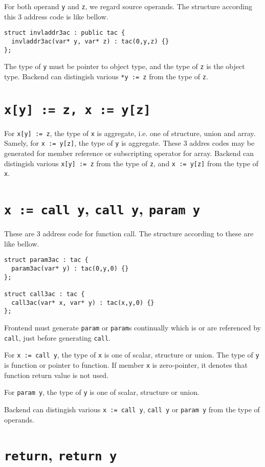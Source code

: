 For both operand {\tt{y}} and {\tt{z}}, we regard source operands.
The structure according this 3 address code is like bellow.
\begin{verbatim}
struct invladdr3ac : public tac {
  invladdr3ac(var* y, var* z) : tac(0,y,z) {}
};
\end{verbatim}
The type of {\tt{y}} must be pointer to object type,
and the type of {\tt{z}} is the object type.
Backend can distingish various {\tt{*y := z}} from the type of {\tt{z}}.

\section{\tt{x[y] := z}, \tt{x := y[z]}}
\label{3ac_e004}
For {\tt{x[y] := z}}, the type of {\tt{x}} is aggregate, i.e.
one of structure, union and array.
Samely, for {\tt{x := y[z]}}, the type of {\tt{y}} is aggregate.
These 3 addres codes may be
generated for member reference or subscripting operator for array.
Backend can distingish various {\tt{x[y] := z}} from the type of
{\tt{z}}, and {\tt{x := y[z]}} from the type of {\tt{x}}.

\section{{\tt{x := call y}}, {\tt{call y}}, {\tt{param y}}}

\label{_3ac_e000} These are 3 address code for function call.
The structure according to these are like bellow.
\begin{verbatim}
struct param3ac : tac {
  param3ac(var* y) : tac(0,y,0) {}
};

struct call3ac : tac {
  call3ac(var* x, var* y) : tac(x,y,0) {}
};
\end{verbatim}
Frontend must generate {\tt{param}} or {\tt{param}}s continually
which is or are referenced by {\tt{call}}, just before generating
{\tt{call}}.

For {\tt{x := call y}}, the type of {\tt{x}} is one
of scalar, structure or union.
The type of {\tt{y}} is function or pointer to function.
If member {\tt{x}} is zero-pointer, it denotes that
function return value is not used.

For {\tt {param y}}, the type of {\tt{y}} is one of
scalar, structure or union.

Backend can distingish various 
{\tt{x := call y}}, {\tt{call y}} or {\tt{param y}}
from the type of operands.

\section{{\tt{return}}, {\tt{return y}}}

